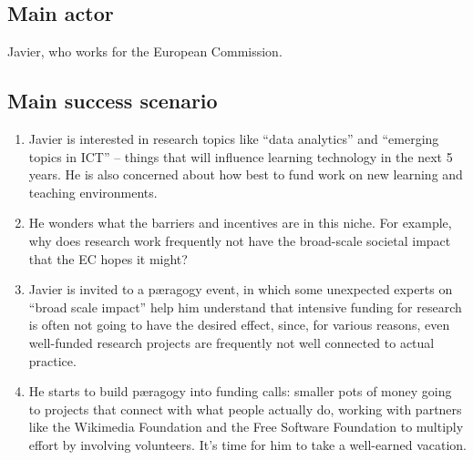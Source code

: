 \subsection{Main actor}

Javier, who works for the European Commission.

\subsection{Main success scenario}

\begin{enumerate}
\item
  Javier is interested in research topics like ``data analytics'' and
  ``emerging topics in ICT'' -- things that will influence learning
  technology in the next 5 years. He is also concerned about how best to
  fund work on new learning and teaching environments.
\item
  He wonders what the barriers and incentives are in this niche. For
  example, why does research work frequently not have the broad-scale
  societal impact that the EC hopes it might?
\item
  Javier is invited to a pæragogy event, in which some unexpected
  experts on ``broad scale impact'' help him understand that intensive
  funding for research is often not going to have the desired effect,
  since, for various reasons, even well-funded research projects are
  frequently not well connected to actual practice.
\item
  He starts to build pæragogy into funding calls: smaller pots of money
  going to projects that connect with what people actually do, working
  with partners like the Wikimedia Foundation and the Free Software
  Foundation to multiply effort by involving volunteers. It's time for
  him to take a well-earned vacation.
\end{enumerate}

